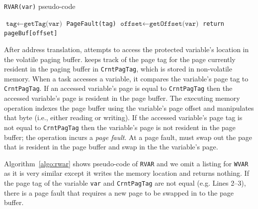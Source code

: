 
\begin{algorithm}[t]
	\caption{\texttt{RVAR(var)} pseudo-code}
	\label{algo:rwar}
	\scriptsize
	\begin{algorithmic}[1]
		\State $\texttt{tag}\leftarrow \texttt{getTag(var)}$ 
			
		\State	\texttt{PageFault(tag)} 
		\EndIf
				\State $\texttt{offset}\leftarrow \texttt{getOffset(var)}$ 		
		\State \texttt{return pageBuf[offset]}  
	\end{algorithmic}
\end{algorithm}

After address translation, \sys attempts to access the protected variable's location in the volatile paging buffer. \sys keeps track of the page tag for the page currently resident in the paging buffer in {\tt CrntPagTag}, which is stored in non-volatile memory. When a task accesses a variable, it compares the variable's page tag to {\tt CrntPagTag}.  If an accessed variable's page is equal to {\tt CrntPagTag} then the accessed variable's page is resident in the page buffer. The executing memory operation indexes the page buffer using the variable's page offset and manipulates that byte (i.e., either reading or writing). If the accessed variable's page tag is not equal to {\tt CrntPagTag} then the variable's page is not resident in the page buffer; the operation incurs a {\em page fault}. At a page fault, \sys must swap out the page that is resident in the page buffer and swap in the the variable's page.

Algorithm~\ref{algo:rwar} shows pseudo-code of \texttt{RVAR} and we omit a listing for {\tt WVAR} as it is very similar except it writes the memory location and returns nothing. If the page tag of the variable \texttt{var} and \texttt{CrntPagTag} are not equal (e.g. Lines 2--3), there is a page fault that requires a new page to be swapped in to the page buffer.

